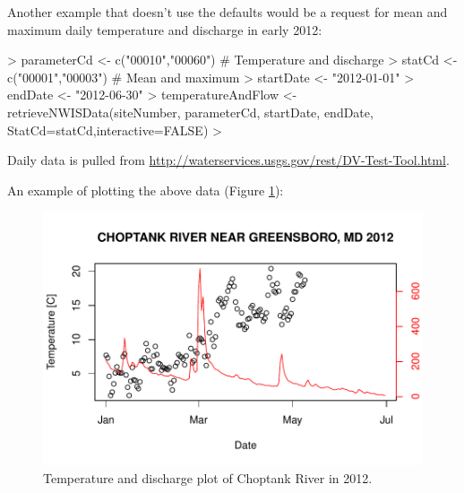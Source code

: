 \documentclass[a4paper,11pt]{article}
\begin{document}
Another example that doesn't use the defaults would be a request for mean and maximum daily temperature and discharge in early 2012:
\begin{Schunk}
\begin{Sinput}
> parameterCd <- c("00010","00060")  # Temperature and discharge
> statCd <- c("00001","00003")  # Mean and maximum
> startDate <- "2012-01-01"
> endDate <- "2012-06-30"
> temperatureAndFlow <- retrieveNWISData(siteNumber, parameterCd, 
         startDate, endDate, StatCd=statCd,interactive=FALSE)
> 
\end{Sinput}
\end{Schunk}

Daily data is pulled from \url{http://waterservices.usgs.gov/rest/DV-Test-Tool.html}. 

An example of plotting the above data (Figure \ref{fig:TD}):

\begin{Schunk}
\end{Schunk}


\begin{figure}
\begin{center}
\includegraphics{dataRetrieval-fig1}
\end{center}
\caption{Temperature and discharge plot of Choptank River in 2012.}
\label{fig:TD}
\end{figure}
\end{document}
